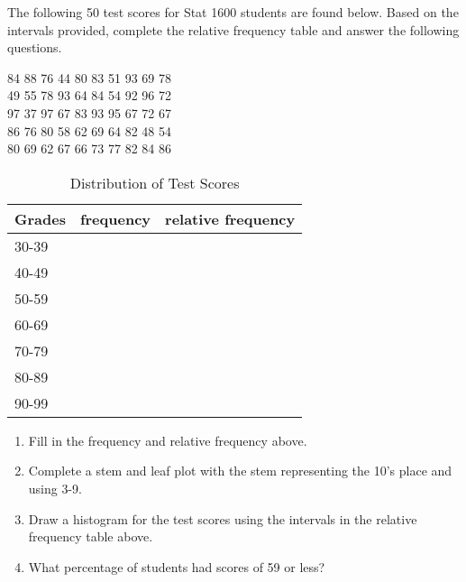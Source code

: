 \documentclass[11pt]{book}\usepackage[]{graphicx}\usepackage[]{color}
\begin{document}
\begin{exercises}
\begin{exercise}
\begin{center}
\end{center}

The following 50 test scores for Stat 1600 students are found below. Based on the intervals provided, complete the relative frequency table and answer the following questions.

84	88	76	44	80	83	51	93	69	78 \\
49	55	78	93	64	84	54	92	96	72 \\
97	37	97	67	83	93	95	67	72	67 \\
86	76	80	58	62	69	64	82	48	54 \\
80	69  62	67	66	73	77	82	84	86

\begin{table}[ht]
\centering
\caption{Distribution of Test Scores}
\begin{tabular}{@{} lcc @{}} \hline
Grades  & frequency & relative frequency \\ \hline
30-39 & & \\
40-49 & & \\
50-59 & & \\
60-69 & & \\
70-79 & & \\
80-89 & & \\
90-99 & & \\ \hline
\end{tabular}
\end{table}

\begin{enumerate}
  \item Fill in the frequency and relative frequency above.
  \item	Complete a stem and leaf plot with the stem representing the 10’s place and using 3-9.
  \item Draw a histogram for the test scores using the intervals in the relative frequency table above.
  \item	What percentage of students had scores of 59 or less?
\end{enumerate}


\end{exercise}
\end{exercises}
\end{document}
